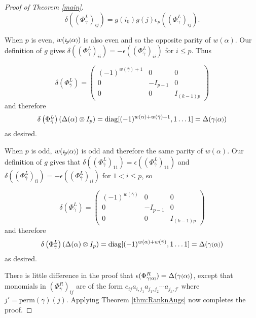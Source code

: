 \documentclass[11pt]{amsart}
\newcommand*{\smallp}[1]{\scalebox{.75}{\ensuremath#1}}
\newcommand*{\subsmallp}[1]{\scalebox{.5}{\ensuremath#1}}
\newcommand{\pp}[2][p]{\imath_{\hspace*{-1pt}#1}\hspace*{-.5pt}\smallp(#2\smallp)}
\newcommand\diag{\operatorname{diag}}
\theoremstyle{definition}
\begin{document}
\begin{proof}[Proof of Theorem \ref{main}]
$$\delta\left(\left(\Phi_{\bar\gamma}^L\right)_{ij}\right) = g(i_0)g(j)\epsilon_p\left(\left(\Phi_{\bar\gamma}^L\right)_{ij}\right).$$

When $p$ is even, $w(\pp\alpha)$ is also even and so the opposite parity of $w(\alpha)$. Our definition of $g$ gives $\delta\left(\left(\Phi_{\bar\gamma}^L\right)_{ii}\right) = -\epsilon\left(\left(\Phi_{\bar\gamma}^L\right)_{ii}\right)$ for $i\le p$. Thus 

$$\delta\left(\Phi_{\bar\gamma}^L\right) = 
\left( \begin{array}{ccc}
(-1)^{w(\bar\gamma)+1} & 0 & 0 \\
0 & -I_{p-1} & 0 \\
0 & 0 & I_{(k-1)p} \end{array} \right)
$$
\noindent and therefore
$$
\delta\left(\Phi_{\bar\gamma}^L\right)\left(\Delta(\alpha)\otimes I_p\right) = \diag[(-1)^{w(\alpha) + w(\bar\gamma) + 1},1\ldots 1] = \Delta(\gamma\smallp(\alpha\smallp))
$$
\noindent as desired.

When $p$ is odd, $w(\pp\alpha)$ is odd and therefore the same parity of $w(\alpha)$. Our definition of $g$ gives that $\delta\left(\left(\Phi_{\bar\gamma}^L\right)_{11}\right) = \epsilon\left(\left(\Phi_{\bar\gamma}^L\right)_{11}\right)$ and $\delta\left(\left(\Phi_{\bar\gamma}^L\right)_{ii}\right) = -\epsilon\left(\left(\Phi_{\bar\gamma}^L\right)_{ii}\right)$ for $1<i\le p$, so 

$$\delta\left(\Phi_{\bar\gamma}^L\right) = 
\left( \begin{array}{ccc}
(-1)^{w(\bar\gamma)} & 0 & 0 \\
0 & -I_{p-1} & 0 \\
0 & 0 & I_{(k-1)p} \end{array} \right)
$$
\noindent and therefore
$$
\delta\left(\Phi_{\bar\gamma}^L\right)\left(\Delta(\alpha)\otimes I_p\right)= \diag[(-1)^{w(\alpha) + w(\bar\gamma)},1\ldots 1] = \Delta(\gamma\smallp(\alpha\smallp))
$$
\noindent as desired. 

There is little difference in the proof that $\epsilon(\Phi_{\gamma\subsmallp(\alpha\subsmallp)}^R) = \Delta(\gamma\smallp(\alpha\smallp))$, except that monomials in $(\Phi_{\bar\gamma}^R)_{ij}$ are of the form $c_{ij}a_{i,j_1}a_{j_1,j_2}\cdots a_{j_k,j'}$ where $j'=\text{perm}(\bar\gamma)(j)$. Applying Theorem \ref{thm:RanknAugs} now completes the proof.
\end{proof}
\end{document}
